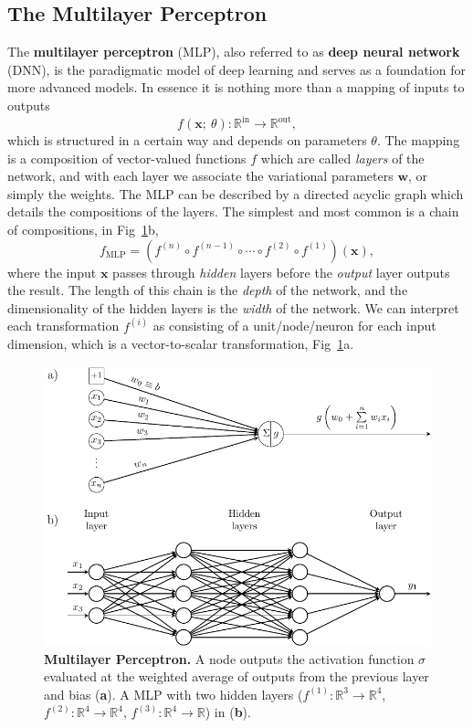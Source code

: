 \subsection{The Multilayer Perceptron}
The \textbf{multilayer perceptron} (MLP), also referred to as \textbf{deep neural network} (DNN), is the paradigmatic model of deep learning and serves as a foundation for more advanced models. In essence it is nothing more than a mapping of inputs to outputs
\begin{equation}
	f(\mathbf{x}; ~\theta): \mathbb{R}^\text{in} \rightarrow \mathbb{R}^{\text{out}},
\end{equation}
which is structured in a certain way and depends on parameters $\theta$. The mapping is a composition of vector-valued functions $f$ which are called \emph{layers} of the network, and with each layer we associate the variational parameters $\mathbf{w}$, or simply the weights. The MLP can be described by a directed acyclic graph which details the compositions of the layers. The simplest and most common is a chain of compositions, in Fig~\ref{fig:mlp}b, 
\begin{equation}
f_{\text{MLP}} = \left(f^{(n)} \circ f^{(n-1)} \circ \cdots \circ f^{(2)} \circ f^{(1)} \right)(\mathbf{x}),
\end{equation}
where the input $\textbf{x}$ passes through \emph{hidden} layers before the \emph{output} layer outputs the result. The length of this chain is the \emph{depth} of the network, and the dimensionality of the hidden layers is the \emph{width} of the network. We can interpret each transformation $f^{(i)}$ as consisting of a unit/node/neuron for each input dimension, which is a vector-to-scalar transformation, Fig~\ref{fig:mlp}a.
\begin{figure}[H]
	\centering
	\includegraphics[width=\linewidth]{Chapter4/Figs/Vector/mlp.pdf}
	\caption[Multilayer Perceptron]{\textbf{Multilayer Perceptron.} A node outputs the activation function $\sigma$ evaluated at the weighted average of outputs from the previous layer and bias (\textbf{a}). A MLP with two hidden layers ($f^{(1)}: \mathbb{R}^3 \rightarrow \mathbb{R}^4$, $f^{(2)}: \mathbb{R}^4 \rightarrow \mathbb{R}^4$, $f^{(3)}: \mathbb{R}^4 \rightarrow \mathbb{R}$) in (\textbf{b}).}
	\label{fig:mlp}
\end{figure} 
